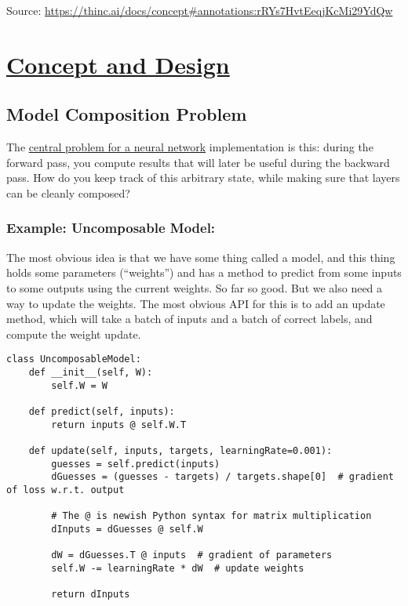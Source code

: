 \documentclass[
]{article}
\author{}
\date{}
\begin{document}
Source:
\url{https://thinc.ai/docs/concept\#annotations:rRYs7HvtEeqjKcMi29YdQw}

\hypertarget{concept-and-design}{%
\section{\texorpdfstring{\href{https://hyp.is/rRYs7HvtEeqjKcMi29YdQw/thinc.ai/docs/concept}{Concept
and Design}}{Concept and Design}}\label{concept-and-design}}

\hypertarget{model-composition-problem}{%
\subsection{Model Composition Problem}\label{model-composition-problem}}

The
\href{https://hyp.is/9KYtjE5DEeqIa_-fEBkiMQ/thinc.ai/docs/concept}{central
problem for a neural network} implementation is this: during the forward
pass, you compute results that will later be useful during the backward
pass. How do you keep track of this arbitrary state, while making sure
that layers can be cleanly composed?

\hypertarget{example-uncomposable-model}{%
\subsubsection{Example: Uncomposable
Model:}\label{example-uncomposable-model}}

The most obvious idea is that we have some thing called a model, and
this thing holds some parameters (``weights'') and has a method to
predict from some inputs to some outputs using the current weights. So
far so good. But we also need a way to update the weights. The most
obvious API for this is to add an update method, which will take a batch
of inputs and a batch of correct labels, and compute the weight update.

\begin{verbatim}
class UncomposableModel:
    def __init__(self, W):
        self.W = W

    def predict(self, inputs):
        return inputs @ self.W.T

    def update(self, inputs, targets, learningRate=0.001):
        guesses = self.predict(inputs)
        dGuesses = (guesses - targets) / targets.shape[0]  # gradient of loss w.r.t. output

        # The @ is newish Python syntax for matrix multiplication
        dInputs = dGuesses @ self.W

        dW = dGuesses.T @ inputs  # gradient of parameters
        self.W -= learningRate * dW  # update weights

        return dInputs
\end{verbatim}
\end{document}
